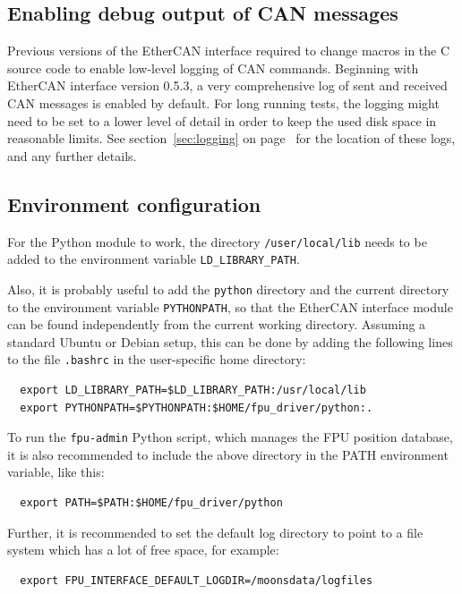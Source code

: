 \documentclass[11pt,a4paper]{scrartcl}
\begin{document}
\subsection{Enabling debug output of CAN messages}

Previous versions of the EtherCAN interface required to change macros in the C
source code to enable low-level logging of CAN commands.  Beginning
with EtherCAN interface version 0.5.3, a very comprehensive log of sent and
received CAN messages is enabled by default. For long running tests,
the logging might need to be set to a lower level of detail in order
to keep the used disk space in reasonable limits.  See
section~\ref{sec:logging} on page~\pageref{sec:logging} for the
location of these logs, and any further details.


\subsection{Environment configuration}

For the Python module to work, the directory \texttt{/user/local/lib}
needs to be added to the environment variable
\texttt{LD\_LIBRARY\_PATH}.

Also, it is probably useful to add the \texttt{python} directory and
the current directory to the environment variable \texttt{PYTHONPATH},
so that the EtherCAN interface module can be found independently from the current
working directory.  Assuming a standard Ubuntu or Debian setup, this
can be done by adding the following lines to the file \texttt{.bashrc}
in the user-specific home directory:

\begin{verbatim}
  export LD_LIBRARY_PATH=$LD_LIBRARY_PATH:/usr/local/lib
  export PYTHONPATH=$PYTHONPATH:$HOME/fpu_driver/python:.
\end{verbatim}

To run the \texttt{fpu-admin} Python script, which manages the FPU
position database, it is also recommended to include the above
directory in the PATH environment variable, like this:

\begin{verbatim}
  export PATH=$PATH:$HOME/fpu_driver/python
\end{verbatim}

 
Further, it is recommended to set the default log directory to point
to a file system which has a lot of free space, for example:
\begin{verbatim}
  export FPU_INTERFACE_DEFAULT_LOGDIR=/moonsdata/logfiles
\end{verbatim}
\end{document}

